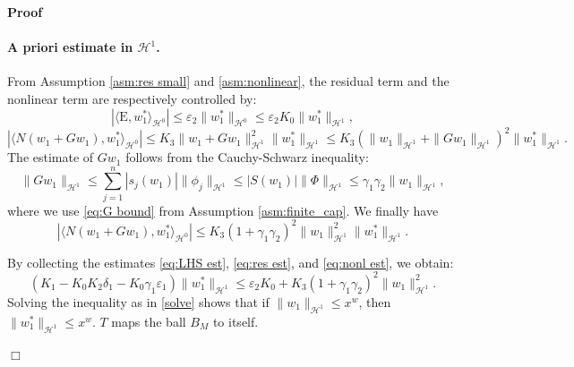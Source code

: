 \documentclass[11pt,a4paper]{article}
\numberwithin{equation}{section}
\newcommand{\Epsilon}{\mathrm{E}}
\newenvironment{proof}{\noindent\textbf{Proof\ }}{\hspace*{\fill}$\Box$\medskip}
\begin{document}
\begin{proof}
  
  

  \paragraph{A priori estimate in $\mathcal{H}^1$.}
  From Assumption \ref{asm:res small} and \ref{asm:nonlinear}, the residual term and the nonlinear term are respectively controlled by:
  \begin{equation}
    | \langle \Epsilon, w_1^{\ast} \rangle_{\mathcal{H}^0} | \leqslant
    \varepsilon_2 \| w_1^{\ast} \|_{\mathcal{H}^0}\leqslant
    \varepsilon_2K_0 \| w_1^{\ast} \|_{\mathcal{H}^1}, \label{eq:res est}
  \end{equation}
  \begin{equation*}
    | \langle N (w_1 + G w_1), w_1^{\ast} \rangle_{\mathcal{H}^0} |
    \leqslant K_3 \| w_1 + G w_1 \|_{\mathcal{H}^1}^2 \|w_1^{\ast}
    \|_{\mathcal{H}^1} \leqslant K_3 (\| w_1 \|_{\mathcal{H}^1} + \| G w_1
    \|_{\mathcal{H}^1})^2 \|w_1^{\ast} \|_{\mathcal{H}^1} .
  \end{equation*}
  The estimate of $G w_1$ follows from the Cauchy-Schwarz inequality:
  \begin{equation} \| G w_1 \|_{\mathcal{H}^1}  \leqslant \sum_{j = 1}^n |s_j (w_1)| \|
     \phi_j \|_{\mathcal{H}^1} \leqslant | S (w_1) | \| \Phi
     \|_{\mathcal{H}^1} \leqslant \gamma_1 \gamma_2 \| w_1 \|_{\mathcal{H}^1} 
     , \label{G collected} \end{equation}
     where we use \eqref{eq:G bound} from Assumption \ref{asm:finite_cap}.
  We finally have
  \begin{equation}
    | \langle N (w_1 + G w_1), w_1^{\ast} \rangle_{\mathcal{H}^0} |
    \leqslant K_3 (1 + \gamma_1 \gamma_2)^2 \| w_1 \|_{\mathcal{H}^1}^2
    \|w_1^{\ast} \|_{\mathcal{H}^1} . \label{eq:nonl est}
  \end{equation}
  
 By collecting the estimates \eqref{eq:LHS est}, \eqref{eq:res est}, and \eqref{eq:nonl est}, we obtain:
  \begin{equation*}
    (K_1 - K_0 K_2 \delta_1  - K_0 \gamma_1  \varepsilon_1)\| w_1^{\ast} \|_{\mathcal{H}^1} \leqslant \varepsilon_2K_0 + K_3 (1 +
    \gamma_1 \gamma_2)^2 \| w_1 \|_{\mathcal{H}^1}^2 . \label{eq:collect}
  \end{equation*}
  Solving the inequality as in \eqref{solve} shows that
  if $\| w_1 \|_{\mathcal{H}^1}\leqslant x^w$, then   $\| w_1^{\ast} \|_{\mathcal{H}^1}\leqslant x^w$. $T$ maps the ball $B_{M}$ to itself.


\end{proof}
\end{document}
